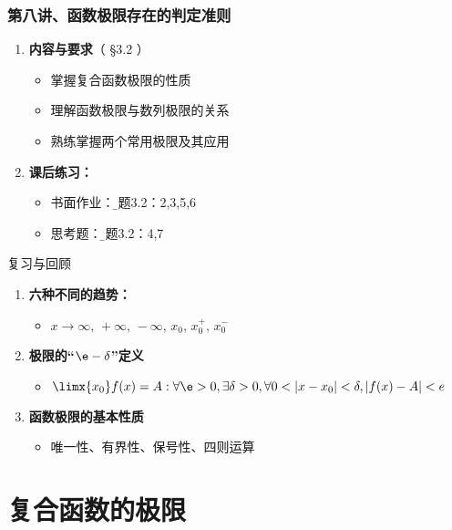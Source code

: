 \begin{frame}
	\frametitle{第八讲、函数极限存在的判定准则}
	\linespread{1.5}
	\begin{enumerate}
	  \item {\bf 内容与要求}{\color{blue}（ \S3.2 ）}
	  \begin{itemize}
	    \item 掌握复合函数极限的性质
	    \item 理解函数极限与数列极限的关系
	    \item 熟练掌握两个常用极限及其应用
	  \vspace{1em}
	  \end{itemize}
	  \item {\bf 课后练习：}
	  \begin{itemize}
	    \item 书面作业：{\b 习题3.2：2,3,5,6}
	    \item 思考题：{\b 习题3.2：4,7}
	  \end{itemize}
	\end{enumerate}
\end{frame}

\begin{frame}[<+->]{复习与回顾}
	\linespread{1.5}
	\begin{enumerate}
	  \item {\bf 六种不同的趋势：}
	  \begin{itemize}
	    \item \alert{$x\to\infty,\,+\infty,\,-\infty,\,x_0,\,x_0^+,\,x_0^-$}
	  \end{itemize}
	  \item {\bf 极限的“$\e-\delta$”定义}
	  \begin{itemize}
	    \item \alert{$\limx{x_0}f(x)=A:\forall\e>0,\exists\delta>0,\forall
	    0<|x-x_0|<\delta,|f(x)-A|<e$}
	  \end{itemize}
	  \item {\bf 函数极限的基本性质}
	  \begin{itemize}
	    \item 唯一性、有界性、保号性、四则运算
	  \end{itemize}
	\end{enumerate}
\end{frame}

\section{复合函数的极限}

